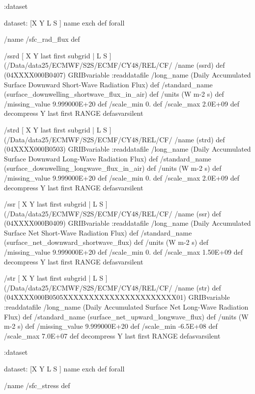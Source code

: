 \begin{ingrid}
:dataset

dataset:
[X Y L S ] {name exch def } forall

/name /sfc_rad_flux def

/ssrd { [ X Y last first subgrid | L S ] (/Data/data25/ECMWF/S2S/ECMF/CY48/REL/CF/%
/name (ssrd) def
(04XXXX000B0407) GRIBvariable
:readdatafile
/long_name (Daily Accumulated Surface Downward Short-Wave Radiation Flux) def
/standard_name (surface_downwelling_shortwave_flux_in_air) def
/units (W m-2 s) def
/missing_value 9.999000E+20 def
/scale_min 0. def
/scale_max 2.0E+09 def
decompress
Y last first RANGE
} defasvarsilent

/strd { [ X Y last first subgrid | L S ] (/Data/data25/ECMWF/S2S/ECMF/CY48/REL/CF/%
/name (strd) def
(04XXXX000B0503) GRIBvariable
:readdatafile
/long_name (Daily Accumulated Surface Downward Long-Wave Radiation Flux) def
/standard_name (surface_downwelling_longwave_flux_in_air) def
/units (W m-2 s) def
/missing_value 9.999000E+20 def
/scale_min 0. def
/scale_max 2.0E+09 def
decompress
Y last first RANGE
} defasvarsilent

/ssr { [ X Y last first subgrid | L S ] (/Data/data25/ECMWF/S2S/ECMF/CY48/REL/CF/%
/name (ssr) def
(04XXXX000B0409) GRIBvariable
:readdatafile
/long_name (Daily Accumulated Surface Net Short-Wave Radiation Flux) def
/standard_name (surface_net_downward_shortwave_flux) def
/units (W m-2 s) def
/missing_value 9.999000E+20 def
/scale_min 0. def
/scale_max 1.50E+09 def
decompress
Y last first RANGE
} defasvarsilent

/str { [ X Y last first subgrid | L S ] (/Data/data25/ECMWF/S2S/ECMF/CY48/REL/CF/%
/name (str) def
(04XXXX000B0505XXXXXXXXXXXXXXXXXXXXXX01) GRIBvariable
:readdatafile
/long_name (Daily Accumulated Surface Net Long-Wave Radiation Flux) def
/standard_name (surface_net_upward_longwave_flux) def
/units (W m-2 s) def
/missing_value 9.999000E+20 def
/scale_min -6.5E+08 def
/scale_max 7.0E+07 def
decompress
Y last first RANGE
} defasvarsilent

:dataset

dataset:
[X Y L S ] {name exch def } forall

/name /sfc_stress def


\end{ingrid}
